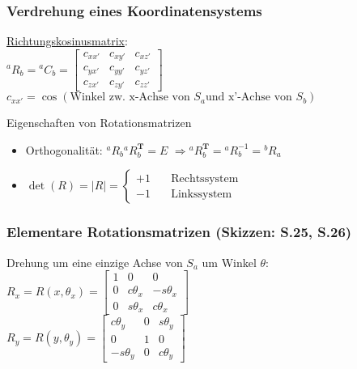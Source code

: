 \documentclass[a4paper,landscape,6pt]{article}
\newcommand{\ma}[1]{\ensuremath{\boldsymbol {#1}}}								%
\newcommand{\mat}[1]{\ensuremath{\begin{bmatrix} #1 \end{bmatrix}}}				%
\newcommand{\ul}[1]{\underline{#1}}
\begin{document}
\begin{multicols}{3}
\subsubsection*{Verdrehung eines Koordinatensystems}
\underline{Richtungskosinusmatrix}:\\

${}^{a}{R}_b = {}^{a}{C}_b = \mat{c_{xx'} & c_{xy'} & c_{xz'} \\ c_{yx'} & c_{yy'} & c_{yz'} \\c_{zx'} & c_{zy'} & c_{zz'}}$\\

$c_{xx'} = \cos(\text{Winkel zw. x-Achse von } S_a \text{und x'-Achse von } S_b)$\\

\begin{infobox}{Eigenschaften von Rotationsmatrizen}
\begin{itemize}
	\item Orthogonalität: ${}^{a}{R}_b {}^{a}{R}_b^{\ma T} = E$
	\subitem $\Rightarrow {}^{a}{R}_b^{\ma T} = {}^{a}{R}_b^{-1} = {}^{b}{R}_a$
	\item $\det(R) = |R| = \left\{
	\begin{array}{cl}
	+1 & \quad \text{Rechtssystem} \\
	-1 & \quad  \text{Linkssystem}
	\end{array} \right. $
\end{itemize}
\end{infobox}

\subsubsection*{Elementare Rotationsmatrizen \footnotesize{(Skizzen: S.25, S.26)}}
Drehung um eine einzige Achse von $S_a$ um Winkel $\theta$:\\

$R_x = R(x,\theta_x) = \mat{1 & 0 & 0 \\ 0 & c\theta_x & -s\theta_x \\ 0 & s\theta_x & c\theta_x}$\\

$R_y = R(y,\theta_y) = \mat{c\theta_y & 0 & s\theta_y \\ 0 & 1  & 0 \\ -s\theta_y & 0 & c\theta_y}$\\


\end{multicols}
\end{document}
